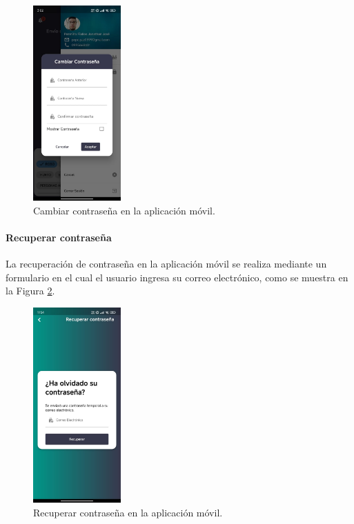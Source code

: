 \begin{figure}[H]
    \centering
    \includegraphics[width=0.3\textwidth]{chapters/III-resultados-y-discusion/resources/images/cambiar-contrasena-movil.png}
    \caption{Cambiar contraseña en la aplicación móvil.}
    \label{fig:cambiar-contrasena-movil}
\end{figure}

\paragraph{Recuperar contraseña}
La recuperación de contraseña en la aplicación móvil se realiza mediante un formulario en el cual el usuario ingresa su correo electrónico,
como se muestra en la Figura \ref{fig:recuperar-contrasena-movil}.

\begin{figure}[H]
    \centering
    \includegraphics[width=0.3\textwidth]{chapters/III-resultados-y-discusion/resources/images/recuperar-contrasena-movil.png}
    \caption{Recuperar contraseña en la aplicación móvil.}
    \label{fig:recuperar-contrasena-movil}
\end{figure}

